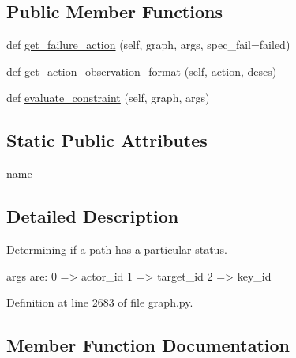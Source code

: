 \subsection*{Public Member Functions}
\begin{DoxyCompactItemize}
\item 
def \hyperlink{classlight__chats_1_1graph_1_1LockedWithConstraint_adf4e0502c0dea2fb13c19779c9f393c5}{get\+\_\+failure\+\_\+action} (self, graph, args, spec\+\_\+fail=\textquotesingle{}failed\textquotesingle{})
\item 
def \hyperlink{classlight__chats_1_1graph_1_1LockedWithConstraint_af7d3c8160d19a1e5ec2ce62d11b54882}{get\+\_\+action\+\_\+observation\+\_\+format} (self, action, descs)
\item 
def \hyperlink{classlight__chats_1_1graph_1_1LockedWithConstraint_a563e85b8f768c315556c077aa2aed7bf}{evaluate\+\_\+constraint} (self, graph, args)
\end{DoxyCompactItemize}
\subsection*{Static Public Attributes}
\begin{DoxyCompactItemize}
\item 
\hyperlink{classlight__chats_1_1graph_1_1LockedWithConstraint_ab4ccf9bea5ce492ae5095b06719cf812}{name}
\end{DoxyCompactItemize}


\subsection{Detailed Description}
\begin{DoxyVerb}Determining if a path has a particular status.

args are:     0 => actor_id     1 => target_id     2 => key_id
\end{DoxyVerb}
 

Definition at line 2683 of file graph.\+py.



\subsection{Member Function Documentation}
\mbox{\label{classlight__chats_1_1graph_1_1LockedWithConstraint_a563e85b8f768c315556c077aa2aed7bf}} 
